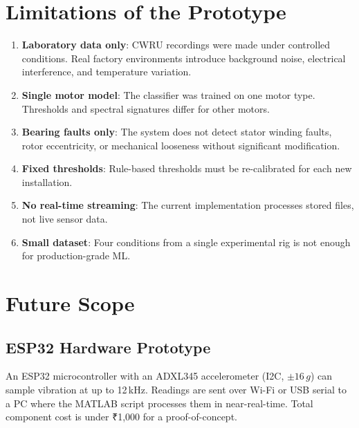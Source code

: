 \documentclass[12pt,a4paper]{article}
\begin{document}
\section{Limitations of the Prototype}

\begin{enumerate}
  \item \textbf{Laboratory data only}: CWRU recordings were made
        under controlled conditions. Real factory environments
        introduce background noise, electrical interference, and
        temperature variation.
  \item \textbf{Single motor model}: The classifier was trained on
        one motor type. Thresholds and spectral signatures differ
        for other motors.
  \item \textbf{Bearing faults only}: The system does not detect
        stator winding faults, rotor eccentricity, or mechanical
        looseness without significant modification.
  \item \textbf{Fixed thresholds}: Rule-based thresholds must be
        re-calibrated for each new installation.
  \item \textbf{No real-time streaming}: The current implementation
        processes stored files, not live sensor data.
  \item \textbf{Small dataset}: Four conditions from a single
        experimental rig is not enough for production-grade ML.
\end{enumerate}

\section{Future Scope}

\subsection{ESP32 Hardware Prototype}

An ESP32 microcontroller with an ADXL345 accelerometer (I2C,
$\pm16\,g$) can sample vibration at up to 12\,kHz. Readings are
sent over Wi-Fi or USB serial to a PC where the MATLAB script
processes them in near-real-time. Total component cost is under
\mbox{\texorpdfstring{₹}{Rs.}1{,}000} for a proof-of-concept.
\end{document}

